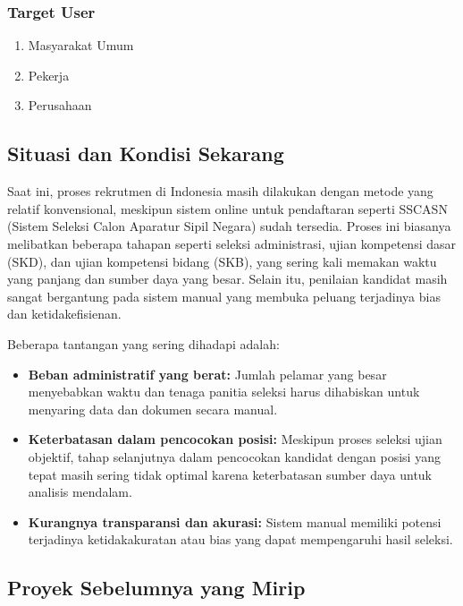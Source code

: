 \documentclass[journal,article,submit,pdftex,moreauthors]{Definitions/mdpi}
\begin{document}
\subsubsection{Target User}
\begin{enumerate}[left=2em]
    \item Masyarakat Umum
    \item Pekerja
    \item Perusahaan
\end{enumerate}

\subsection{Situasi dan Kondisi Sekarang}

Saat ini, proses rekrutmen di Indonesia masih dilakukan dengan metode yang relatif konvensional, meskipun sistem online untuk pendaftaran seperti SSCASN (Sistem Seleksi Calon Aparatur Sipil Negara) sudah tersedia. Proses ini biasanya melibatkan beberapa tahapan seperti seleksi administrasi, ujian kompetensi dasar (SKD), dan ujian kompetensi bidang (SKB), yang sering kali memakan waktu yang panjang dan sumber daya yang besar. Selain itu, penilaian kandidat masih sangat bergantung pada sistem manual yang membuka peluang terjadinya bias dan ketidakefisienan.

Beberapa tantangan yang sering dihadapi adalah:
\begin{itemize}[left=2em]
    \item \textbf{Beban administratif yang berat:} Jumlah pelamar yang besar menyebabkan waktu dan tenaga panitia seleksi harus dihabiskan untuk menyaring data dan dokumen secara manual.
    \item \textbf{Keterbatasan dalam pencocokan posisi:} Meskipun proses seleksi ujian objektif, tahap selanjutnya dalam pencocokan kandidat dengan posisi yang tepat masih sering tidak optimal karena keterbatasan sumber daya untuk analisis mendalam.
    \item \textbf{Kurangnya transparansi dan akurasi:} Sistem manual memiliki potensi terjadinya ketidakakuratan atau bias yang dapat mempengaruhi hasil seleksi.
\end{itemize}

\subsection{Proyek Sebelumnya yang Mirip}
\end{document}
